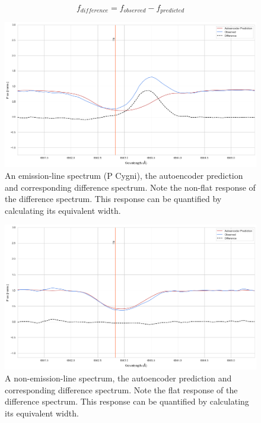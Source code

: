 \begin{equation}
   f_{difference} = f_{observed} - f_{predicted}
\label{formula:6.1}
\end{equation}

\begin{figure}[!htb]
\centering
\includegraphics[scale=0.45]{figures/normal difference.png}
\caption{An emission-line spectrum (P Cygni), the autoencoder prediction and corresponding difference spectrum. Note the non-flat response of the difference spectrum. This response can be quantified by calculating its equivalent width.}
\label{fig6.3}
\end{figure}

\begin{figure}[!htb]
\centering
\includegraphics[scale=0.45]{figures/non emission difference.png}
\caption{A non-emission-line spectrum, the autoencoder prediction and corresponding difference spectrum. Note the flat response of the difference spectrum. This response can be quantified by calculating its equivalent width.}
\label{fig6.4}
\end{figure}

